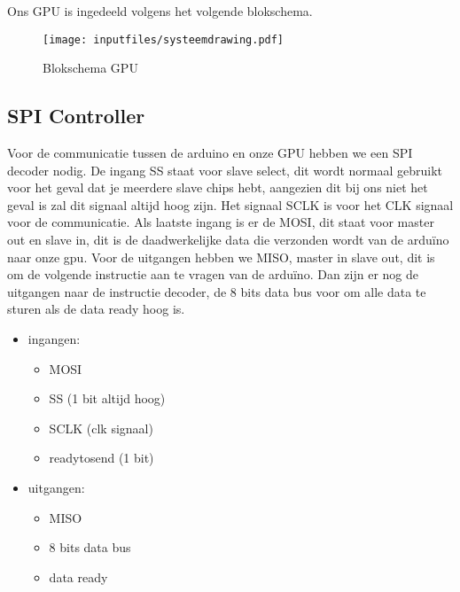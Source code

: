 
Ons GPU is ingedeeld volgens het volgende blokschema.
\begin{figure}[H]
\centering
        \texttt{[image: inputfiles/systeemdrawing.pdf]}
        \caption{Blokschema GPU}
        \label{fig:Blokschema GPU}
\end{figure}


\subsection{SPI Controller}
Voor de communicatie tussen de arduino en onze GPU hebben we een SPI decoder nodig. De ingang SS staat voor slave select, dit wordt normaal gebruikt voor het geval dat je meerdere slave chips hebt, aangezien dit bij ons niet het geval is zal dit signaal altijd hoog zijn. Het signaal SCLK is voor het CLK signaal voor de communicatie. Als laatste ingang is er de MOSI, dit staat voor master out en slave in, dit is de daadwerkelijke data die verzonden wordt van de arduïno naar onze gpu. Voor de uitgangen hebben we MISO, master in slave out, dit is om de volgende instructie aan te vragen van de arduïno. Dan zijn er nog de uitgangen naar de instructie decoder, de 8 bits data bus voor om alle data te sturen als de data ready hoog is.

\begin {itemize}
\item ingangen:
\begin {itemize}
\item MOSI 
\item SS (1 bit altijd hoog)
\item SCLK (clk signaal)
\item readytosend (1 bit)
\end {itemize}
\item uitgangen:
\begin {itemize}
\item MISO
\item 8 bits data bus
\item data ready
\end {itemize}
\end {itemize}

